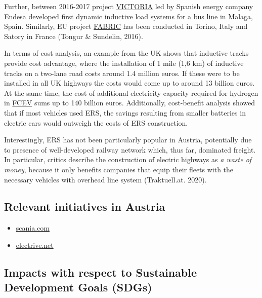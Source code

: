 \documentclass[
]{book}
\providecommand{\tightlist}{%
  \setlength{\itemsep}{0pt}\setlength{\parskip}{0pt}}
\begin{document}
Further, between 2016-2017 project \href{https://www.fcirce.es/en/smart-mobility-en-en/victoria-2}{VICTORIA} led by Spanish energy company Endesa developed first dynamic inductive load systems for a bus line in Malaga, Spain. Similarly, EU project \href{https://trimis.ec.europa.eu/project/feasibility-analysis-and-development-road-charging-solutions-future-electric-vehicles}{FABRIC} has been conducted in Torino, Italy and Satory in France (Tongur \& Sundelin, 2016).

In terms of cost analysis, an example from the UK shows that inductive tracks provide cost advantage, where the installation of 1 mile (1,6 km) of inductive tracks on a two-lane road costs around 1.4 million euros. If these were to be installed in all UK highways the costs would come up to around 13 billion euros. At the same time, the cost of additional electricity capacity required for hydrogen in \protect\hyperlink{FCEV}{FCEV} sums up to 140 billion euros. Additionally, cost-benefit analysis showed that if most vehicles used ERS, the savings resulting from smaller batteries in electric cars would outweigh the costs of ERS construction.

Interestingly, ERS has not been particularly popular in Austria, potentially due to presence of well-developed railway network which, thus far, dominated freight. In particular, critics describe the construction of electric highways as \emph{a waste of money}, because it only benefits companies that equip their fleets with the necessary vehicles with overhead line system (Traktuell.at. 2020).

\hypertarget{relevant-initiatives-in-austria-1}{%
\subsection*{Relevant initiatives in Austria}\label{relevant-initiatives-in-austria-1}}

\begin{itemize}
\tightlist
\item
  \href{https://www.scania.com/at/de/home/products-and-services/trucks/sustainability/elektro-mobilitaet/oberleitungs-lkw.html}{scania.com}
\item
  \href{https://www.electrive.net/2019/07/24/auswertung-der-these-zu-lastkraftwagen-an-oberleitungen/}{electrive.net}
\end{itemize}

\hypertarget{impacts-with-respect-to-sustainable-development-goals-sdgs-1}{%
\subsection*{Impacts with respect to Sustainable Development Goals (SDGs)}\label{impacts-with-respect-to-sustainable-development-goals-sdgs-1}}
\end{document}
